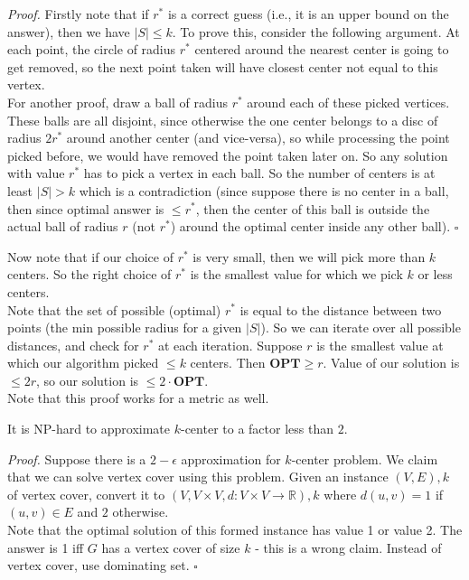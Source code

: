\documentclass[a4paper]{article}
\newenvironment{proof}{\begin{breakbox}\textit{Proof.}}{\hfill$\square$\end{breakbox}}
\newcommand{\nl}{\vspace{0.2cm}\\}
\newcommand{\R}{\mathbb{R}}
\newcommand{\OPT}{\mathbf{OPT}}
\begin{document}
\begin{proof}
    Firstly note that if $r^*$ is a correct guess (i.e., it is an upper bound on the answer), then we have $|S| \le k$. To prove this, consider the following argument. At each point, the circle
    of radius $r^*$ centered around the nearest center is going to get removed, so the next point taken will have closest center not equal to this vertex.\nl
    For another proof, draw a ball of radius
    $r^*$ around each of these picked vertices. These balls are all disjoint, since otherwise the one center belongs to a disc of radius $2r^*$ around another center (and vice-versa), so while
    processing the point picked before, we would have removed the point taken later on. So any solution with value $r^*$ has to pick a vertex in each ball. So the number of centers is at least $|S|
    > k$ which is a contradiction (since suppose there is no center in a ball, then since optimal answer is $\le r^*$, then the center of this ball is outside the actual ball of radius $r$ (not
    $r^*$) around the optimal center inside any other ball).
\end{proof}

Now note that if our choice of $r^*$ is very small, then we will pick more than $k$ centers. So the right choice of $r^*$ is the smallest value for which we pick $k$ or less centers.\nl
Note that the set of possible (optimal) $r^*$ is equal to the distance between two points (the min possible radius for a given $|S|$). So we can iterate over all possible distances, and check for $r^*$ at each iteration. Suppose $r$
is the smallest value at which our algorithm picked $\le k$ centers. Then $\OPT \ge r$. Value of our solution is $\le 2r$, so our solution is $\le 2 \cdot \OPT$.\nl
Note that this proof works for a metric as well.\nl
\begin{claim}
    It is NP-hard to approximate $k$-center to a factor less than $2$.
\end{claim}
\begin{proof}
    Suppose there is a $2 - \epsilon$ approximation for $k$-center problem. We claim that we can solve vertex cover using this problem. Given an instance $(V, E), k$ of vertex cover, convert it
    to $(V, V \times V, d : V \times V \to \R), k$ where $d(u, v) = 1$ if $(u, v) \in E$ and $2$ otherwise.\nl
    Note that the optimal solution of this formed instance has value 1 or value 2. The answer is 1 iff $G$ has a vertex cover of size $k$ - this is a wrong claim. Instead of vertex cover, use
    dominating set.
\end{proof}
\end{document}
